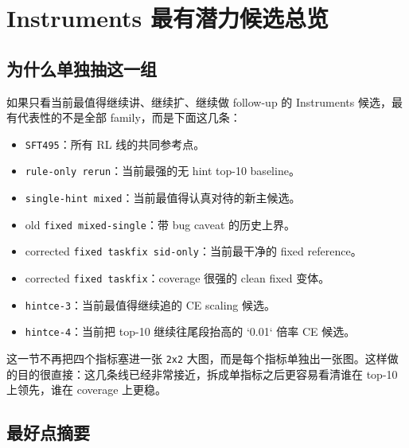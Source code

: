 \section{Instruments 最有潜力候选总览}

\subsection{为什么单独抽这一组}

如果只看当前最值得继续讲、继续扩、继续做 follow-up 的 Instruments 候选，最有代表性的不是全部 family，而是下面这几条：

\begin{itemize}
\item \texttt{SFT495}：所有 RL 线的共同参考点。
\item \texttt{rule-only rerun}：当前最强的无 hint top-10 baseline。
\item \texttt{single-hint mixed}：当前最值得认真对待的新主候选。
\item old \texttt{fixed mixed-single}：带 bug caveat 的历史上界。
\item corrected \texttt{fixed taskfix sid-only}：当前最干净的 fixed reference。
\item corrected \texttt{fixed taskfix}：coverage 很强的 clean fixed 变体。
\item \texttt{hintce-3}：当前最值得继续追的 CE scaling 候选。
\item \texttt{hintce-4}：当前把 top-10 继续往尾段抬高的 `0.01` 倍率 CE 候选。
\end{itemize}

这一节不再把四个指标塞进一张 \texttt{2x2} 大图，而是每个指标单独出一张图。这样做的目的很直接：这几条线已经非常接近，拆成单指标之后更容易看清谁在 top-10 上领先，谁在 coverage 上更稳。

\subsection{最好点摘要}

